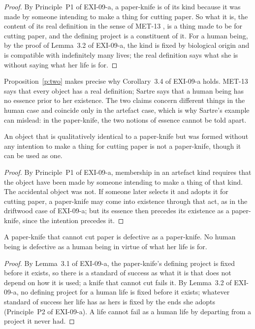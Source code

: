 \documentclass{situationist-preprint}
\begin{document}
\begin{proof}
By Principle~P1 of EXI-09-a, a paper-knife is of its kind because it was made by someone intending to make a thing for cutting paper. So what it is, the content of its real definition in the sense of MET-13 \citep{Fine1994}, is a thing made to be for cutting paper, and the defining project is a constituent of it. For a human being, by the proof of Lemma~3.2 of EXI-09-a, the kind is fixed by biological origin and is compatible with indefinitely many lives; the real definition says what she is without saying what her life is for.
\end{proof}

Proposition~\ref{p:two} makes precise why Corollary~3.4 of EXI-09-a holds. MET-13 says that every object has a real definition; Sartre says that a human being has no essence prior to her existence. The two claims concern different things in the human case and coincide only in the artefact case, which is why Sartre's example can mislead: in the paper-knife, the two notions of essence cannot be told apart.

\begin{proposition}\label{p:swamp}
An object that is qualitatively identical to a paper-knife but was formed without any intention to make a thing for cutting paper is not a paper-knife, though it can be used as one.
\end{proposition}

\begin{proof}
By Principle~P1 of EXI-09-a, membership in an artefact kind requires that the object have been made by someone intending to make a thing of that kind. The accidental object was not. If someone later selects it and adopts it for cutting paper, a paper-knife may come into existence through that act, as in the driftwood case of EXI-09-a; but its essence then precedes its existence as a paper-knife, since the intention precedes it.
\end{proof}

\begin{proposition}[Defect]\label{p:defect}
A paper-knife that cannot cut paper is defective as a paper-knife. No human being is defective as a human being in virtue of what her life is for.
\end{proposition}

\begin{proof}
By Lemma~3.1 of EXI-09-a, the paper-knife's defining project is fixed before it exists, so there is a standard of success as what it is that does not depend on how it is used; a knife that cannot cut fails it. By Lemma~3.2 of EXI-09-a, no defining project for a human life is fixed before it exists; whatever standard of success her life has as hers is fixed by the ends she adopts (Principle~P2 of EXI-09-a). A life cannot fail as a human life by departing from a project it never had.
\end{proof}
\end{document}

